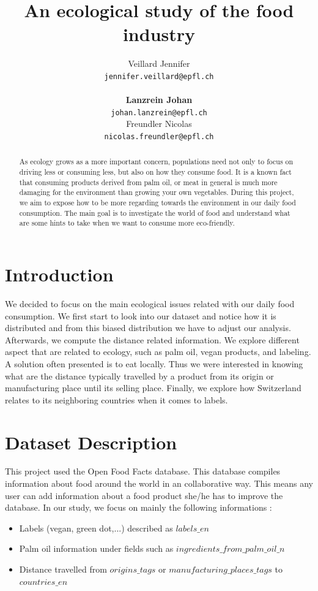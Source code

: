 \documentclass[11pt]{article}
\title{An ecological study of the food industry}
\author{Veillard Jennifer \\
  {\tt jennifer.veillard@epfl.ch} \\\And
  \\\textbf{Lanzrein Johan} \\
  {\tt johan.lanzrein@epfl.ch} \\\And
Freundler Nicolas \\
{\tt nicolas.freundler@epfl.ch} \\}
\date{}
\begin{document}
\maketitle
\begin{abstract}
As ecology grows as a more important concern, populations need not only to focus on driving less or consuming less, but also on how they consume food. It is a known fact that consuming products derived from palm oil, or meat in general is much more damaging for the environment than growing your own vegetables. During this project, we aim to expose how to be more regarding towards the environment in our daily food consumption.
The main goal is to investigate the world of food and understand what are some hints to take when we want to consume more eco-friendly.
\end{abstract}

\section{Introduction}

We decided to focus on the main ecological issues related with our daily food consumption. We first start to look into our dataset and notice how it is distributed and from this biased distribution we have to adjust our analysis. Afterwards, we compute the distance related information. We explore different aspect that are related to ecology, such as palm oil, vegan products, and labeling.  
A solution often presented is to eat locally. Thus we were interested in knowing what are the distance typically travelled by a product from its origin or manufacturing place until its selling place.
Finally, we explore how Switzerland relates to its neighboring countries when it comes to labels.


\section{Dataset Description}
This project used the Open Food Facts database. This database compiles information about food around the world in an collaborative way. This means any user can add information about a food product she/he has to improve the database. In our study, we focus on mainly the following informations : 
\begin{itemize}
    \item Labels (vegan, green dot,...) described as $labels\_en$
    \vspace{-0.3cm}
    \item Palm oil information under fields such as $ingredients\_from\_palm\_oil\_n$
    \vspace{-0.3cm}
    \item Distance travelled from $origins\_tags$ or $manufacturing\_ places\_tags$ to $countries\_en$
\end{itemize}
\end{document}
